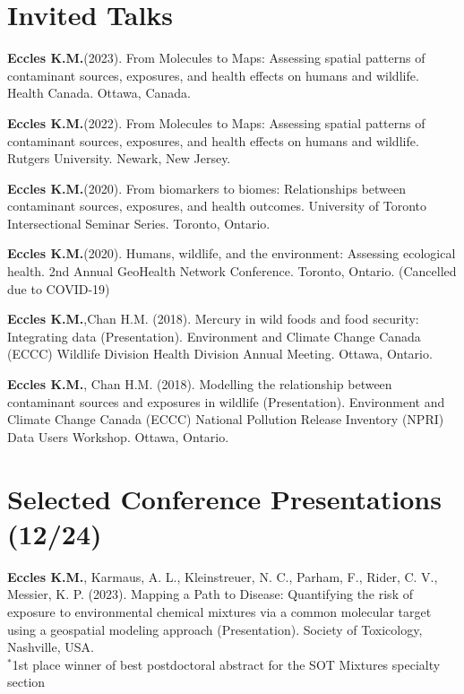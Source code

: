 \documentclass[margin,line]{res}
\begin{document}
\begin{resume}
\vspace*{.1in}
\section{\sc Invited Talks}

\textbf{Eccles K.M.}(2023). From Molecules to Maps: Assessing spatial patterns of contaminant sources, exposures, and health effects on humans and wildlife. Health Canada. Ottawa, Canada.

\textbf{Eccles K.M.}(2022). From Molecules to Maps: Assessing spatial patterns of contaminant sources, exposures, and health effects on humans and wildlife. Rutgers University. Newark, New Jersey.

\textbf{Eccles K.M.}(2020). From biomarkers to biomes: Relationships between contaminant sources, exposures, and health outcomes. University of Toronto Intersectional Seminar Series. Toronto, Ontario.

\textbf{Eccles K.M.}(2020). Humans, wildlife, and the environment: Assessing ecological health. 2nd Annual GeoHealth Network Conference. Toronto, Ontario. (Cancelled due to COVID-19)

\textbf{Eccles K.M.},Chan H.M. (2018). Mercury in wild foods and food security: Integrating data (Presentation). Environment and Climate Change Canada (ECCC) Wildlife Division Health Division Annual Meeting. Ottawa, Ontario.

\textbf{Eccles K.M.}, Chan H.M. (2018). Modelling the relationship between contaminant sources and exposures in wildlife (Presentation). Environment and Climate Change Canada (ECCC) National Pollution Release Inventory (NPRI) Data Users Workshop. Ottawa, Ontario.

\vspace*{.1in}
\section{\sc Selected Conference Presentations (12/24)}

\textbf{Eccles K.M.}, Karmaus, A. L., Kleinstreuer, N. C., Parham, F., Rider, C. V., Messier, K. P. (2023). Mapping a Path to Disease: Quantifying the risk of exposure to environmental chemical mixtures via a common molecular target using a geospatial modeling approach (Presentation). Society of Toxicology, Nashville, USA.\\
$^{*}$1st place winner of best postdoctoral abstract for the SOT Mixtures specialty section


\end{resume}
\end{document}
